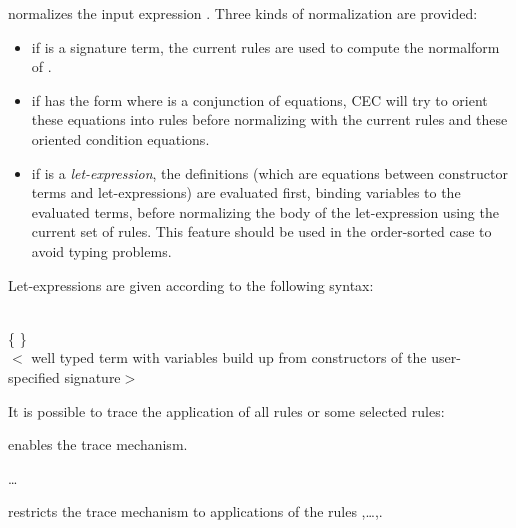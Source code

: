 \begin{command}
normalizes the input expression . Three kinds of normalization are
provided:
\begin{itemize}
\item
if  is a signature term, the current rules are used to compute the
normalform of .
\item
if  has the form  
where  is
a conjunction of equations, CEC will try to orient these equations into
rules before normalizing  with the current rules and these oriented
condition equations.
\item
if  is a {\em let-expression}, the definitions (which
are equations between constructor terms and let-expressions) 
are evaluated first,
binding variables to the evaluated terms, before normalizing the body
of the let-expression using the current set of rules. This feature
should be used in the order-sorted case to avoid typing problems.
\end{itemize}
Let-expressions are given according to the following syntax:

\begin{syntax}
 \IS {}   \END
\\
    \IS {} \{   \} \END
{}     \IS {} \kw{=} 
		    \OR {} \kw{=}  \END
\\
        \IS $<$ \rm well typed term with variables build up from
                    \GETON \hspace{2ex} constructors of the user-specified signature$>$
\end{syntax}

\noindent 
It is possible to trace the application of all rules or some selected rules:\medskip


\noindent enables the trace mechanism.\medskip

\kw{rulesToTrace:=[}\ad\ldots\ad{}\kw{]}

\noindent restricts the trace mechanism to applications of the
rules ,\ldots,.
\end{command}


